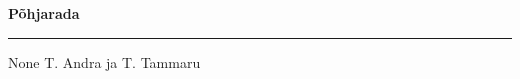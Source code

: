 \documentclass[10pt]{book}
\begin{document}
{
  \samepage
  \raggedbottom
  \raggedright
  \sloppy


  \vspace{0.2in}

  \noindent\begin{minipage}{.1\textwidth}
    \hfill\vspace{0.1in}
  \end{minipage}%
  \noindent\begin{minipage}{.8\textwidth}
    \centering
    \bfseries
    \large P\~ohjarada
  \end{minipage}%
  \noindent\begin{minipage}{.1\textwidth}
      \hfill\vspace{0.1in}
  \end{minipage}

  \nopagebreak[4]
  \vspace{0.1in}
  \nopagebreak[4]
  \hrule height 0.05ex
  \nopagebreak[4]
  \vspace{-0.05in}

  {\footnotesize None \hfill T. Andra ja T. Tammaru }\\
  \vspace{0.01in}



}
\end{document}

